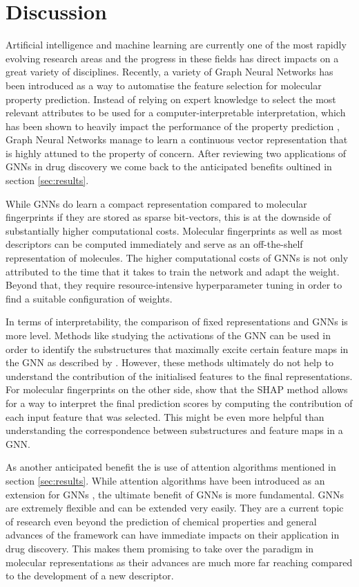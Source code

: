 \section{Discussion}
Artificial intelligence and machine learning are currently one of the most rapidly evolving research areas and the progress in these fields has direct impacts on  a great variety of disciplines. Recently, a variety of Graph Neural Networks has been introduced as a way to automatise the feature selection for molecular property prediction. Instead of relying on expert knowledge to select the most relevant attributes to be used for a computer-interpretable interpretation, which has been shown to heavily impact the performance of the property prediction \citep{tian}, Graph Neural Networks manage to learn a continuous vector representation that is highly attuned to the property of concern. After reviewing two applications of GNNs in drug discovery we come back to the anticipated benefits oultined in section \ref{sec:results}. 

While GNNs do learn a compact representation compared to molecular fingerprints if they are stored as sparse bit-vectors, this is at the downside of substantially higher computational costs. Molecular fingerprints as well as most descriptors can be computed immediately and serve as an off-the-shelf representation of molecules. The higher computational costs of GNNs is not only attributed to the time that it takes to train the network and adapt the weight. Beyond that, they require resource-intensive hyperparameter tuning in order to find a suitable configuration of weights. 

In terms of interpretability, the comparison of fixed representations and GNNs is more level. Methods like studying the activations of the GNN can be used in order to identify the substructures that maximally excite certain feature maps in the GNN as described by \cite{duvenaud2015convolutional}. However, these methods ultimately do not help to understand the contribution of the initialised features to the final representations. For molecular fingerprints on the other side, \cite{jiang} show that the SHAP method \citep{lundberg2017unified} allows for a way to interpret the final prediction scores by computing the contribution of each input feature that was selected. This might be even more helpful than understanding the correspondence between substructures and feature maps in a GNN. 

As another anticipated benefit the is use of attention algorithms mentioned in section \ref{sec:results}. While attention algorithms have been introduced as an extension for GNNs \citep{gan, graphattentionmpp}, the ultimate benefit of GNNs is more fundamental. GNNs are extremely flexible and can be extended very easily. They are a current topic of research even beyond the prediction of chemical properties and general advances of the framework can have immediate impacts on their application in drug discovery. This makes them promising to take over the paradigm in molecular representations as their advances are much more far reaching compared to the development of a new descriptor.

